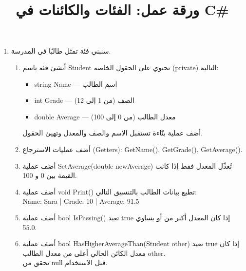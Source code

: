 \documentclass[14pt]{extarticle}
\title{ورقة عمل: الفئات والكائنات في \textenglish{C\#}}
\begin{document}
\maketitle
\thispagestyle{fancy}

\begin{enumerate}[itemsep=2em]

\item
سنبني فئة تمثل طالبًا في المدرسة.
\begin{enumerate}[itemsep=1em]
    \item أنشئ فئة باسم \textenglish{Student} تحتوي على الحقول الخاصة (\textenglish{private}) التالية:
    \begin{itemize}[itemsep=1pt]
        \item \textenglish{string Name} — اسم الطالب
        \item \textenglish{int Grade} — الصف (من 1 إلى 12)
        \item \textenglish{double Average} — معدل الطالب (من 0 إلى 100)
    \end{itemize}
    أضف عملية بنّاءة تستقبل الاسم والصف والمعدل وتهيئ الحقول.

    \item أضف عمليات الاسترجاع (\textenglish{Getters}):
    \textenglish{GetName()}, \textenglish{GetGrade()}, \textenglish{GetAverage()}.

    \item أضف عملية \textenglish{SetAverage(double newAverage)} تُعدِّل المعدل فقط إذا كانت القيمة بين \textenglish{0} و \textenglish{100}.

    \item أضف عملية \textenglish{void Print()} تطبع بيانات الطالب بالتنسيق التالي: \\
    \textenglish{Name: Sara | Grade: 10 | Average: 91.5}

    \item أضف عملية \textenglish{bool IsPassing()} تعيد \textenglish{true} إذا كان المعدل أكبر من أو يساوي \textenglish{55.0}.

    \item أضف عملية \textenglish{bool HasHigherAverageThan(Student other)} تعيد \textenglish{true} إذا كان معدل الكائن الحالي أعلى من معدل الطالب \textenglish{other}.\\
    تحقق من \textenglish{null} قبل الاستخدام.


\end{enumerate}
\end{enumerate}
\end{document}
